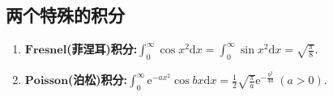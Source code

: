 \documentclass[../../main.tex]{subfiles}%
\begin{document}
\subsection{两个特殊的积分}

\begin{proposition}\label{proposition:几个特殊积分的计算}
\begin{enumerate}[(1)]
\item\label{proposition:几个特殊积分的计算-Fresnel积分} $\mathbf{Fresnel}$\textbf{(菲涅耳)积分:}\(\int_{0}^{\infty} \cos x^2 \mathrm{d}x=\int_{0}^{\infty} \sin x^2 \mathrm{d}x=\sqrt{\frac{\pi}{8}}\).

\item\label{proposition:几个特殊积分的计算-Poisson积分} $\mathbf{Poisson}$\textbf{(泊松)积分:}\(\int_{0}^{\infty} \mathrm{e}^{-ax^2} \cos bx \mathrm{d}x = \frac{1}{2} \sqrt{\frac{\pi}{a}} \mathrm{e}^{-\frac{b^2}{4a}} \ (a > 0).\)
\end{enumerate}
\end{proposition}
\end{document}
